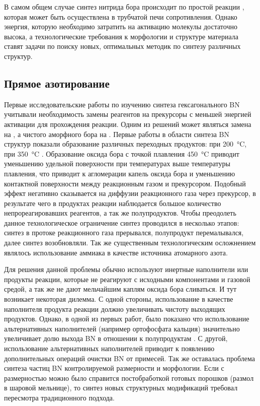 В самом общем случае синтез нитрида бора происходит по простой реакции , 
которая может быть осуществлена в трубчатой печи сопротивления. Однако энергия, которую 
необходимо затратить на активацию молекулы  достаточно высока,
а технологические требования к морфологии и структуре материала ставят
задачи по поиску новых, оптимальных методик по синтезу различных структур. 

\subsection{Прямое азотирование}%
\label{sub:Прямое азотирование}

Первые исследовательские работы по изучению синтеза гексагонального BN учитывали
необходимость замены реагентов на прекурсоры с  меньшей энергией активации для 
прохождения реакции. Одним из решений может являться
замена  на , а чистого аморфного бора на . Первые
работы в области синтеза BN структур показали образование различных переходных 
продуктов:  при \SI{200}{\degreeCelsius},
 при \SI{350}{\degreeCelsius}
\cite[]{economy_boron_1967}. Образование оксида бора с точкой плавления
\SI{450}{\degreeCelsius} приводит уменьшению удельной поверхности при
температурах выше температуры плавления, что приводит к агломерации
капель оксида бора и уменьшению контактной поверхности между реакционным
газом и прекурсором. Подобный эффект негативно сказывается на диффузии реакционного
газа через прекурсор, в результате чего в продуктах реакции наблюдается большое 
количество непрореагировавших реагентов, а так же полупродуктов. Чтобы преодолеть
данное технологическое ограничение синтез проводился в несколько этапов: синтез
в протоке реакционного газа прерывался, полупродукт перемалывался, далее синтез
возобновляли. Так же существенным технологическим осложнением являлось 
использование аммиака в качестве источника атомарного азота.

Для решения данной проблемы обычно используют инертные наполнители или
продукты реакции, которые не реагируют с исходными компонентами и газовой
средой, а так же не дают мельчайшим каплям оксида бора сливаться. И тут
возникает некоторая дилемма. С одной стороны, использование в качестве
наполнителя продукта реакции должно увеличивать чистоту выходящих
продуктов. Однако, в одной из первых работ, было показано что
использование альтернативных наполнителей (например ортофосфата кальция)
значительно увеличивает долю выхода BN в отношении к полупродуктам
\cite[]{basu_synthesis_1990}. С другой, использование альтернативных
наполнителей приводит к появлению дополнительных операций очистки BN от
примесей. Так же оставалась проблема синтеза частиц BN контролируемой
размерности и морфологии. Если с размерностью можно было справится
постобработкой готовых порошков (размол в шаровой мельнице), то синтез 
новых структурных модификаций требовал пересмотра
традиционного подхода.

